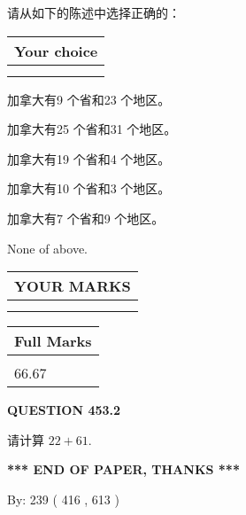\documentclass{ctexart}
\begin{document}
  
请从如下的陈述中选择正确的：
  
  
\noindent\hspace{3.0in} \begin{tabular}{|l|}
\hline
Your choice \\
\hline
 \\ 
 \\ 
\hline
\end{tabular}
  
  
 
 
加拿大有9 个省和23 个地区。
 
 
加拿大有25 个省和31 个地区。
 
 
加拿大有19 个省和4 个地区。
 
 
加拿大有10 个省和3 个地区。
 
 
加拿大有7 个省和9 个地区。
 
 
 None of above.
 
 
  
\vspace{0.2in}
  
\noindent\begin{tabular}{|l|}
\hline
 YOUR MARKS  \\
\hline
 \\ 
 \\ 
\hline
\end{tabular}
\hspace{0.05in} \begin{tabular}{|l|}
\hline
 Full Marks  \\
\hline
 \\ 
66.67 \\
\hline
\end{tabular}
{\textbf{\Large{QUESTION
453.2 
}}}
  
  
 
请计算 $ %
22 +  %
61 $.
 

 

 
   
   
 \vspace{0.2in}
 
   
   
   
   
\vspace{1.0in} 
{\textbf{\large{ *** END OF PAPER, THANKS *** }}} 
   
   
\hspace{1.0in} By: 
 239 ( 416 ,  613 )
   
\end{document}
